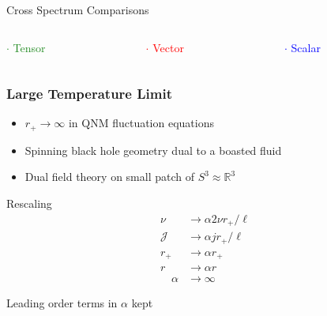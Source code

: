 \documentclass[xcolor=dvipsnames]{beamer}
\begin{document}
\begin{frame}{Cross Spectrum Comparisons}
  \vfill

  \begin{columns}[c]
    \begin{column}{0.33\textwidth}
      \textcolor{ForestGreen}{$\cdot$ Tensor}
    \end{column}

    \begin{column}{0.33\textwidth}
      \textcolor{red}{$\cdot$ Vector}
    \end{column}

    \begin{column}{0.33\textwidth}
      \textcolor{blue}{$\cdot$ Scalar}
    \end{column}
  \end{columns}
\end{frame}

\begin{frame}[squeeze]
  \frametitle{Large Temperature Limit}

  \begin{itemize}
    \item $r_+ \to \infty$ in QNM fluctuation equations
    \item Spinning black hole geometry dual to a boasted fluid
    \item Dual field theory on small patch of $S^3 \approx \mathbb{R}^3$
  \end{itemize}

  \begin{block}{Rescaling}
    \begin{equation*}
      \begin{aligned}
        \nu &\to \alpha 2\nu r_+/\ell \\
        \mathcal{J} &\to \alpha j r_+/\ell \\
        r_+ &\to \alpha r_+ \\
        r &\to \alpha r\\
        \quad \alpha&\to\infty
      \end{aligned}
    \end{equation*}
  \end{block}

  \begin{alertblock}{}
    Leading order terms in $\alpha$ kept
  \end{alertblock}

\end{frame}

\end{document}
